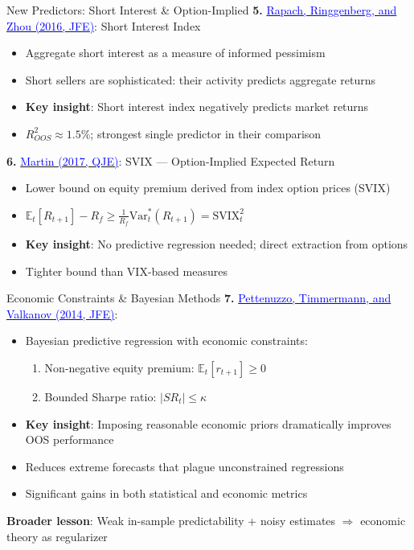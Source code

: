 \documentclass{beamer}
\begin{document}
\begin{frame}{New Predictors: Short Interest \& Option-Implied}
	\textbf{5.} \href{https://doi.org/10.1016/j.jfineco.2016.03.004}{\textcolor{blue}{Rapach, Ringgenberg, and Zhou (2016, JFE)}}: Short Interest Index
	\begin{itemize}
		\item Aggregate short interest as a measure of informed pessimism
		\item Short sellers are sophisticated: their activity predicts aggregate returns
		\item \textbf{Key insight}: Short interest index negatively predicts market returns
		\item $R^2_{OOS} \approx 1.5\%$; strongest single predictor in their comparison
	\end{itemize}

	\vspace{8pt}
	\textbf{6.} \href{https://doi.org/10.1093/qje/qjw034}{\textcolor{blue}{Martin (2017, QJE)}}: SVIX --- Option-Implied Expected Return
	\begin{itemize}
		\item Lower bound on equity premium derived from index option prices (SVIX)
		\item $\mathbb{E}_t[R_{t+1}] - R_f \geq \frac{1}{R_f}\text{Var}^*_t(R_{t+1}) = \text{SVIX}^2_t$
		\item \textbf{Key insight}: No predictive regression needed; direct extraction from options
		\item Tighter bound than VIX-based measures
	\end{itemize}
\end{frame}

\begin{frame}{Economic Constraints \& Bayesian Methods}
	\textbf{7.} \href{https://doi.org/10.1016/j.jfineco.2014.07.015}{\textcolor{blue}{Pettenuzzo, Timmermann, and Valkanov (2014, JFE)}}:
	\begin{itemize}
		\item Bayesian predictive regression with economic constraints:
		\begin{enumerate}
			\item Non-negative equity premium: $\mathbb{E}_t[r_{t+1}] \geq 0$
			\item Bounded Sharpe ratio: $|SR_t| \leq \kappa$
		\end{enumerate}
		\item \textbf{Key insight}: Imposing reasonable economic priors dramatically improves OOS performance
		\item Reduces extreme forecasts that plague unconstrained regressions
		\item Significant gains in both statistical and economic metrics
	\end{itemize}

	\vspace{8pt}
	\textbf{Broader lesson}: Weak in-sample predictability + noisy estimates $\Rightarrow$ economic theory as regularizer
\end{frame}
\end{document}
